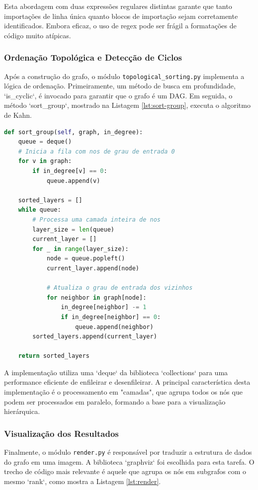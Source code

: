 \documentclass[12pt]{article}
\begin{document}
Esta abordagem com duas expressões regulares distintas garante que tanto importações de linha única quanto blocos de importação sejam corretamente identificados. Embora eficaz, o uso de regex pode ser frágil a formatações de código muito atípicas.

\subsubsection{Ordenação Topológica e Detecção de Ciclos}
Após a construção do grafo, o módulo \texttt{topological\_sorting.py} implementa a lógica de ordenação. Primeiramente, um método de busca em profundidade, `is{\_}cyclic`, é invocado para garantir que o grafo é um DAG. Em seguida, o método `sort{\_}group`, mostrado na Listagem \ref{lst:sort-group}, executa o algoritmo de Kahn.

\begin{lstlisting}[language=Python, caption={Trecho do código de ordenação topológica (Kahn).}, label={lst:sort-group}]
def sort_group(self, graph, in_degree):
    queue = deque()
    # Inicia a fila com nos de grau de entrada 0
    for v in graph:
        if in_degree[v] == 0:
            queue.append(v)
    
    sorted_layers = []
    while queue:
        # Processa uma camada inteira de nos
        layer_size = len(queue)
        current_layer = []
        for _ in range(layer_size):
            node = queue.popleft()
            current_layer.append(node)
            
            # Atualiza o grau de entrada dos vizinhos
            for neighbor in graph[node]:
                in_degree[neighbor] -= 1
                if in_degree[neighbor] == 0:
                    queue.append(neighbor)
        sorted_layers.append(current_layer)
        
    return sorted_layers
\end{lstlisting}

A implementação utiliza uma `deque` da biblioteca `collections` para uma performance eficiente de enfileirar e desenfileirar. A principal característica desta implementação é o processamento em "camadas", que agrupa todos os nós que podem ser processados em paralelo, formando a base para a visualização hierárquica.

\subsubsection{Visualização dos Resultados}
Finalmente, o módulo \texttt{render.py} é responsável por traduzir a estrutura de dados do grafo em uma imagem. A biblioteca `graphviz` \cite{graphviz} foi escolhida para esta tarefa. O trecho de código mais relevante é aquele que agrupa os nós em subgrafos com o mesmo `rank`, como mostra a Listagem \ref{lst:render}.
\end{document}
